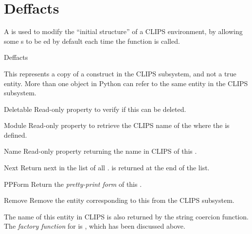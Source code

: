 \section{Deffacts\label{pyclips-cl-Deffacts}}

A  is used to modify the ``initial structure'' of a CLIPS
environment, by allowing some s to be ed by
default each time the  function is called.

\begin{classdesc*}{Deffacts}

This represents a copy of a  construct in the CLIPS
subsystem, and not a true  entity. More than one
 object in Python can refer to the same 
entity in the CLIPS subsystem.

\begin{memberdesc}[property]{Deletable}
Read-only property to verify if this  can be deleted.
\end{memberdesc}

\begin{memberdesc}[property]{Module}
Read-only property to retrieve the CLIPS name of the 
where the  is defined.
\end{memberdesc}

\begin{memberdesc}[property]{Name}
Read-only property returning the name in CLIPS of this .
\end{memberdesc}

\begin{methoddesc}{Next}{}
Return next  in the list of all .
 is returned at the end of the list.
\end{methoddesc}

\begin{methoddesc}{PPForm}{}
Return the \emph{pretty-print form} of this .
\end{methoddesc}

\begin{methoddesc}{Remove}{}
Remove the entity corresponding to this  from the CLIPS
subsystem.
\end{methoddesc}

The name of this entity in CLIPS is also returned by the string coercion
function. The \emph{factory function} for  is
, which has been discussed above.

\end{classdesc*}



